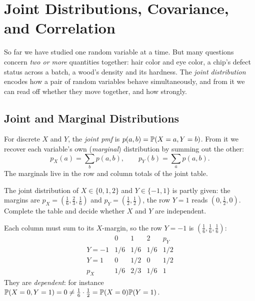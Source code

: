 \chapter{Joint Distributions, Covariance, and Correlation}
\label{ch:joint}

So far we have studied one random variable at a time. But many questions
concern \emph{two or more} quantities together: hair color and eye color, a
chip's defect status across a batch, a wood's density and its hardness. The
\emph{joint distribution} encodes how a pair of random variables behave
simultaneously, and from it we can read off whether they move together, and how
strongly.

\section{Joint and Marginal Distributions}

For discrete $X$ and $Y$, the \emph{joint pmf} is $p(a,b)=\mathbb{P}(X=a,Y=b)$. From
it we recover each variable's own (\emph{marginal}) distribution by summing out
the other:
\[
  p_X(a)=\sum_b p(a,b),\qquad p_Y(b)=\sum_a p(a,b).
\]
The marginals live in the row and column totals of the joint table.

\begin{example}
The joint distribution of $X\in\{0,1,2\}$ and $Y\in\{-1,1\}$ is partly given:
the margins are $p_X=(\tfrac16,\tfrac23,\tfrac16)$ and
$p_Y=(\tfrac12,\tfrac12)$, the row $Y=1$ reads $(0,\tfrac12,0)$. Complete the
table and decide whether $X$ and $Y$ are independent.

\solution Each column must sum to its $X$-margin, so the row $Y=-1$ is
$(\tfrac16,\tfrac16,\tfrac16)$:
\[
\begin{array}{c|ccc|c}
 & 0 & 1 & 2 & p_Y\\\hline
 Y=-1 & 1/6 & 1/6 & 1/6 & 1/2\\
 Y=1 & 0 & 1/2 & 0 & 1/2\\\hline
 p_X & 1/6 & 2/3 & 1/6 & 1
\end{array}
\]
They are \emph{dependent}: for instance
$\mathbb{P}(X=0,Y=1)=0\neq\tfrac16\cdot\tfrac12=\mathbb{P}(X=0)\mathbb{P}(Y=1)$.
\end{example}

